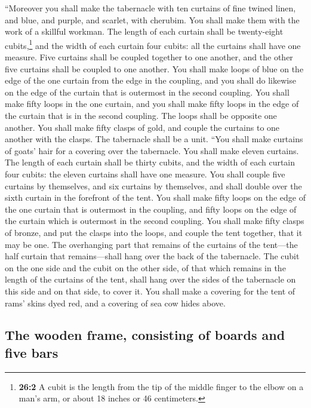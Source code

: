  ``Moreover you shall make the tabernacle with ten
curtains of fine twined linen, and blue, and purple, and scarlet, with
cherubim. You shall make them with the work of a skillful workman.
 The length of each curtain shall be twenty-eight
cubits,\footnote{\textbf{26:2} A cubit is the length from the tip of the
  middle finger to the elbow on a man's arm, or about 18 inches or 46
  centimeters.} and the width of each curtain four cubits: all the
curtains shall have one measure.  Five curtains shall be
coupled together to one another, and the other five curtains shall be
coupled to one another.  You shall make loops of blue on
the edge of the one curtain from the edge in the coupling, and you shall
do likewise on the edge of the curtain that is outermost in the second
coupling.  You shall make fifty loops in the one curtain,
and you shall make fifty loops in the edge of the curtain that is in the
second coupling. The loops shall be opposite one another. 
You shall make fifty clasps of gold, and couple the curtains to one
another with the clasps. The tabernacle shall be a unit. 
``You shall make curtains of goats' hair for a covering over the
tabernacle. You shall make eleven curtains.  The length of
each curtain shall be thirty cubits, and the width of each curtain four
cubits: the eleven curtains shall have one measure.  You
shall couple five curtains by themselves, and six curtains by
themselves, and shall double over the sixth curtain in the forefront of
the tent.  You shall make fifty loops on the edge of the
one curtain that is outermost in the coupling, and fifty loops on the
edge of the curtain which is outermost in the second coupling.
 You shall make fifty clasps of bronze, and put the
clasps into the loops, and couple the tent together, that it may be one.
 The overhanging part that remains of the curtains of the
tent---the half curtain that remains---shall hang over the back of the
tabernacle.  The cubit on the one side and the cubit on
the other side, of that which remains in the length of the curtains of
the tent, shall hang over the sides of the tabernacle on this side and
on that side, to cover it.  You shall make a covering for
the tent of rams' skins dyed red, and a covering of sea cow hides above.

\hypertarget{the-wooden-frame-consisting-of-boards-and-five-bars}{%
\subsection{The wooden frame, consisting of boards and five
bars}\label{the-wooden-frame-consisting-of-boards-and-five-bars}}

